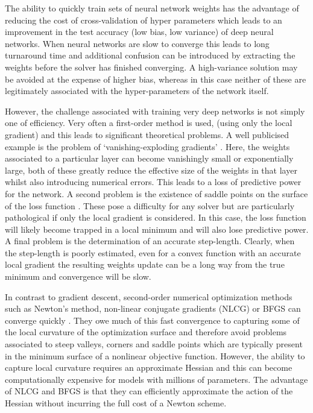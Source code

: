 \documentclass[nohyperref]{article}
\theoremstyle{plain}
\theoremstyle{definition}
\theoremstyle{remark}
\begin{document}
The ability to quickly train sets of neural network weights has the advantage of reducing the cost of cross-validation of hyper parameters which leads to an improvement in the test accuracy (low bias, low variance) of deep neural networks. When neural networks are slow to converge this leads to long turnaround time and additional confusion can be introduced by extracting the weights before the solver has finished converging. A high-variance solution may be avoided at the expense of higher bias, whereas in this case neither of these are legitimately associated with the hyper-parameters of the network itself. 

However, the challenge associated with training very deep networks is not simply one of efficiency. Very often a first-order method is used, (using only the local gradient) and this leads to significant theoretical problems. A well publicised example is the problem of `vanishing-exploding gradients' \citep[see][]{Huang:Stoch}. Here, the weights associated to a particular layer can become vanishingly small or exponentially large, both of these greatly reduce the effective size of the weights in that layer whilst also introducing numerical errors. This leads to a loss of predictive power for the network. A second problem is the existence of saddle points on the surface of the loss function \citep[see][]{Martens:Deep}. These pose a difficulty for any solver but are particularly pathological if only the local gradient is considered. In this case, the loss function will likely become trapped in a local minimum and will also lose predictive power. A final problem is the determination of an accurate step-length. Clearly, when the step-length is poorly estimated, even for a convex function with an accurate local gradient the resulting weights update can be a long way from the true minimum and convergence will be slow.  
   
In contrast to gradient descent, second-order numerical optimization methods such as Newton's method, non-linear conjugate gradients (NLCG) or BFGS can converge quickly \citep[see][]{Nocedal:Wright}. They owe much of this fast convergence to capturing some of the local curvature of the optimization surface and therefore avoid problems associated to steep valleys, corners and saddle points which are typically present in the minimum surface of a nonlinear objective function. However, the ability to capture local curvature requires an approximate Hessian and this can become computationally expensive for models with millions of parameters. The advantage of NLCG and BFGS is that they can efficiently approximate the action of the Hessian without incurring the full cost of a Newton scheme.
\end{document}
